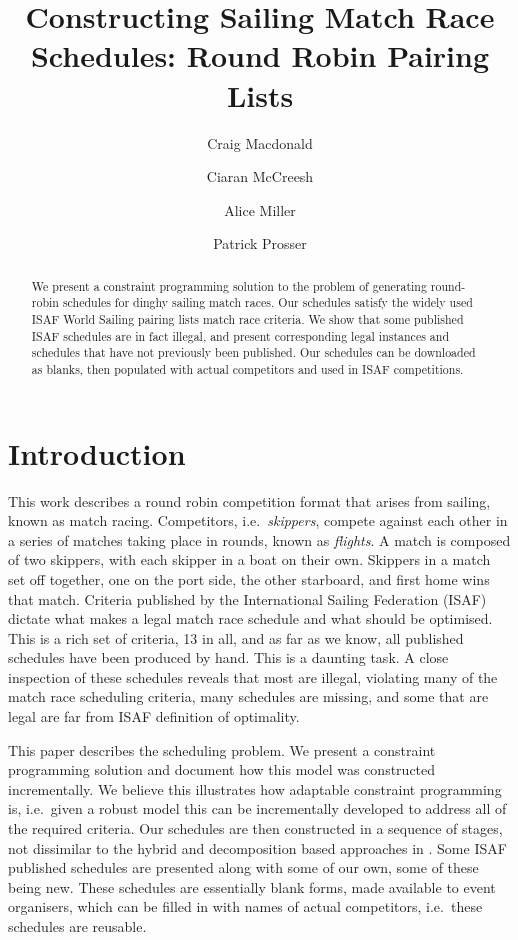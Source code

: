 \documentclass{llncs}
\begin{document}
\title{Constructing Sailing Match Race Schedules: Round Robin Pairing Lists}
\author{Craig Macdonald \and Ciaran McCreesh \and Alice Miller \and Patrick Prosser}
\maketitle

\begin{abstract}
We present a constraint programming solution to the problem of generating round-robin schedules for
dinghy sailing match races. Our schedules satisfy the widely used ISAF World Sailing pairing lists
match race criteria. We show that some published ISAF schedules are in fact illegal, and present
corresponding legal instances and schedules that have not previously been published. Our schedules
can be downloaded as blanks, then populated with actual competitors and used in ISAF competitions.
\end{abstract}

\section{Introduction}

This work describes a round robin competition format that arises from sailing, known as match
racing. Competitors, i.e.\ \emph{skippers}, compete against each other in a series of matches taking
place in rounds, known as \emph{flights}.  A match is composed of two skippers, with each skipper in
a boat on their own. Skippers in a match set off together, one on the port side, the other starboard,
and first home wins that match. Criteria published by the International Sailing Federation (ISAF)
dictate what makes a legal match race schedule and what should be optimised. This is a rich set of
criteria, 13 in all, and as far as we know, all published schedules have been produced by hand. This
is a daunting task. A close inspection of these schedules reveals that most are illegal, violating
many of the match race scheduling criteria, many schedules are missing, and some that are legal are
far from ISAF definition of optimality.

This paper describes the scheduling problem. We present a constraint programming solution and
document how this model was constructed incrementally. We believe this illustrates how adaptable
constraint programming is, i.e.\ given a robust model this can be incrementally developed to
address all of the required criteria. Our schedules are then constructed in a sequence of stages,
not dissimilar to the hybrid and decomposition based approaches in \cite{lombardi2012}. Some ISAF
published schedules are presented along with some of our own, some of these being new.  These
schedules are essentially blank forms, made available to event organisers, which can be filled in
with names of actual competitors, i.e.\ these schedules are reusable.
\end{document}
